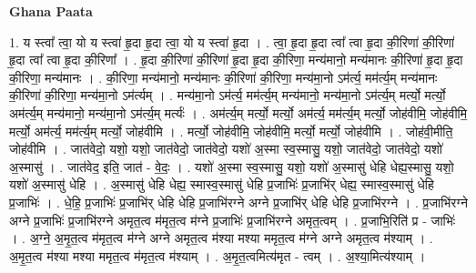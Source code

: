 \documentclass[17pt]{extarticle}
\begin{document}
\textbf{Ghana Paata } \newline

1. य स्त्वा᳚ त्वा॒ यो य स्त्वा॑ हृ॒दा हृ॒दा त्वा॒ यो य स्त्वा॑ हृ॒दा । . त्वा॒ हृ॒दा हृ॒दा त्वा᳚ त्वा हृ॒दा की॒रिणा॑ की॒रिणा॑ हृ॒दा त्वा᳚ त्वा हृ॒दा की॒रिणा᳚ । . हृ॒दा की॒रिणा॑ की॒रिणा॑ हृ॒दा हृ॒दा की॒रिणा॒ मन्य॑मानो॒ मन्य॑मानः की॒रिणा॑ हृ॒दा हृ॒दा की॒रिणा॒ मन्य॑मानः । . की॒रिणा॒ मन्य॑मानो॒ मन्य॑मानः की॒रिणा॑ की॒रिणा॒ मन्य॑मा॒नो ऽम॑र्त्य॒ मम॑र्त्य॒म् मन्य॑मानः की॒रिणा॑ की॒रिणा॒ मन्य॑मा॒नो ऽम॑र्त्यम् । . मन्य॑मा॒नो ऽम॑र्त्य॒ मम॑र्त्य॒म् मन्य॑मानो॒ मन्य॑मा॒नो ऽम॑र्त्य॒म् मर्त्यो॒ मर्त्यो॒ अम॑र्त्य॒म् मन्य॑मानो॒ मन्य॑मा॒नो ऽम॑र्त्य॒म् मर्त्यः॑ । . अम॑र्त्य॒म् मर्त्यो॒ मर्त्यो॒ अम॑र्त्य॒ मम॑र्त्य॒म् मर्त्यो॒ जोह॑वीमि॒ जोह॑वीमि॒ मर्त्यो॒ अम॑र्त्य॒ मम॑र्त्य॒म् मर्त्यो॒ जोह॑वीमि । . मर्त्यो॒ जोह॑वीमि॒ जोह॑वीमि॒ मर्त्यो॒ मर्त्यो॒ जोह॑वीमि । . जोह॑वी॒मीति॒ जोह॑वीमि । . जात॑वेदो॒ यशो॒ यशो॒ जात॑वेदो॒ जात॑वेदो॒ यशो॑ अ॒स्मा स्व॒स्मासु॒ यशो॒ जात॑वेदो॒ जात॑वेदो॒ यशो॑ अ॒स्मासु॑ । . जात॑वेद॒ इति॒ जात॑ - वे॒दः॒ । . यशो॑ अ॒स्मा स्व॒स्मासु॒ यशो॒ यशो॑ अ॒स्मासु॑ धेहि धेह्य॒स्मासु॒ यशो॒ यशो॑ अ॒स्मासु॑ धेहि । . अ॒स्मासु॑ धेहि धेह्य॒ स्मास्व॒स्मासु॑ धेहि प्र॒जाभिः॑ प्र॒जाभि॑र् धेह्य॒ स्मास्व॒स्मासु॑ धेहि प्र॒जाभिः॑ । . धे॒हि॒ प्र॒जाभिः॑ प्र॒जाभि॑र् धेहि धेहि प्र॒जाभि॑रग्ने अग्ने प्र॒जाभि॑र् धेहि धेहि प्र॒जाभि॑रग्ने । . प्र॒जाभि॑रग्ने अग्ने प्र॒जाभिः॑ प्र॒जाभि॑रग्ने अमृत॒त्व म॑मृत॒त्व म॑ग्ने प्र॒जाभिः॑ प्र॒जाभि॑रग्ने अमृत॒त्वम् । . प्र॒जाभि॒रिति॑ प्र - जाभिः॑ । . अ॒ग्ने॒ अ॒मृ॒त॒त्व म॑मृत॒त्व म॑ग्ने अग्ने अमृत॒त्व म॑श्या मश्या ममृत॒त्व म॑ग्ने अग्ने अमृत॒त्व म॑श्याम् । . अ॒मृ॒त॒त्व म॑श्या मश्या ममृत॒त्व म॑मृत॒त्व म॑श्याम् । . अ॒मृ॒त॒त्वमित्य॑मृत - त्वम् । . अ॒श्या॒मित्य॑श्याम् । \newline
\end{document}
